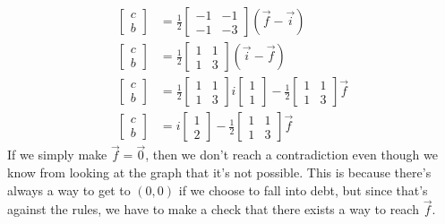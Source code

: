 \documentclass[letterpaper, 12pt]{article}
\begin{document}
\begin{align*}
    \begin{bmatrix}
        c\\
        b
    \end{bmatrix}
    &=
    \frac{1}{2}
    \begin{bmatrix}
        -1 &-1\\
        -1 &-3
    \end{bmatrix}
    (\vec{f} - \vec{i})\\
    \begin{bmatrix}
        c\\
        b
    \end{bmatrix}
    &=
    \frac{1}{2}
    \begin{bmatrix}
        1 & 1\\
        1 & 3
    \end{bmatrix}
    (\vec{i} - \vec{f})\\
    \begin{bmatrix}
        c\\
        b
    \end{bmatrix}
    &=
    \frac{1}{2}
    \begin{bmatrix}
        1 & 1\\
        1 & 3
    \end{bmatrix}
    i
    \begin{bmatrix}
        1\\
        1
    \end{bmatrix}
    -
    \frac{1}{2}
    \begin{bmatrix}
        1 & 1\\
        1 & 3
    \end{bmatrix}
    \vec{f}\\
    \begin{bmatrix}
        c\\
        b
    \end{bmatrix}
    &=
    i
    \begin{bmatrix}
        1\\
        2
    \end{bmatrix}
    -
    \frac{1}{2}
    \begin{bmatrix}
        1 & 1\\
        1 & 3
    \end{bmatrix}
    \vec{f}
\end{align*}
If we simply make $\vec{f} = \vec{0}$, then we don't reach a contradiction even though we know from looking at the graph that it's not possible.
This is because there's always a way to get to $(0, 0)$ if we choose to fall into debt, but since that's against the rules, we have to make a check that there exists a way to reach $\vec{f}$.
\end{document}
